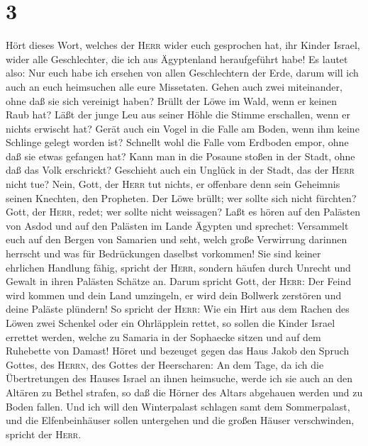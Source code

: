 \hypertarget{section-2}{%
\section{3}\label{section-2}}

 Hört dieses Wort, welches der \textsc{Herr} wider euch
gesprochen hat, ihr Kinder Israel, wider alle Geschlechter, die ich aus
Ägyptenland heraufgeführt habe!  Es lautet also: Nur euch
habe ich ersehen von allen Geschlechtern der Erde, darum will ich auch
an euch heimsuchen alle eure Missetaten.  Gehen auch zwei
miteinander, ohne daß sie sich vereinigt haben?  Brüllt
der Löwe im Wald, wenn er keinen Raub hat? Läßt der junge Leu aus seiner
Höhle die Stimme erschallen, wenn er nichts erwischt hat? 
Gerät auch ein Vogel in die Falle am Boden, wenn ihm keine Schlinge
gelegt worden ist? Schnellt wohl die Falle vom Erdboden empor, ohne daß
sie etwas gefangen hat?  Kann man in die Posaune stoßen in
der Stadt, ohne daß das Volk erschrickt? Geschieht auch ein Unglück in
der Stadt, das der \textsc{Herr} nicht tue?  Nein, Gott,
der \textsc{Herr} tut nichts, er offenbare denn sein Geheimnis seinen
Knechten, den Propheten.  Der Löwe brüllt; wer sollte sich
nicht fürchten? Gott, der \textsc{Herr}, redet; wer sollte nicht
weissagen?  Laßt es hören auf den Palästen von Asdod und
auf den Palästen im Lande Ägypten und sprechet: Versammelt euch auf den
Bergen von Samarien und seht, welch große Verwirrung darinnen herrscht
und was für Bedrückungen daselbst vorkommen!  Sie sind
keiner ehrlichen Handlung fähig, spricht der \textsc{Herr}, sondern
häufen durch Unrecht und Gewalt in ihren Palästen Schätze an.
 Darum spricht Gott, der \textsc{Herr}: Der Feind wird
kommen und dein Land umzingeln, er wird dein Bollwerk zerstören und
deine Paläste plündern!  So spricht der \textsc{Herr}:
Wie ein Hirt aus dem Rachen des Löwen zwei Schenkel oder ein Ohrläpplein
rettet, so sollen die Kinder Israel errettet werden, welche zu Samaria
in der Sophaecke sitzen und auf dem Ruhebette von Damast!
 Höret und bezeuget gegen das Haus Jakob den Spruch
Gottes, des \textsc{Herrn}, des Gottes der Heerscharen: 
An dem Tage, da ich die Übertretungen des Hauses Israel an ihnen
heimsuche, werde ich sie auch an den Altären zu Bethel strafen, so daß
die Hörner des Altars abgehauen werden und zu Boden fallen.
 Und ich will den Winterpalast schlagen samt dem
Sommerpalast, und die Elfenbeinhäuser sollen untergehen und die großen
Häuser verschwinden, spricht der \textsc{Herr}.

